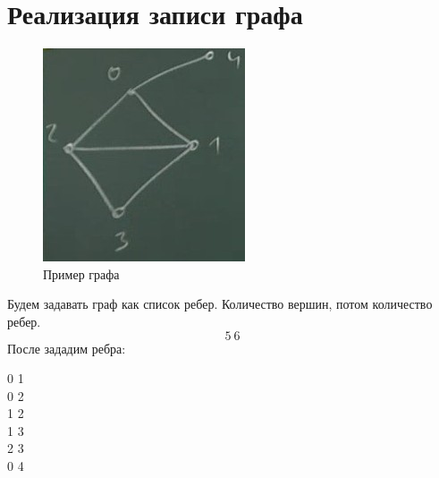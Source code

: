 \documentclass[a4paper,12pt]{article}
\theoremstyle{plain} %
\theoremstyle{definition} %
\theoremstyle{remark} %
\begin{document}
\section{Реализация записи графа}
\begin{figure}
		\begin{center}
			\includegraphics[width=\linewidth]{graph1}
			\caption{Пример графа}
			\label{Fig:graph1}
		\end{center}
\end{figure}
Будем задавать граф как список ребер. Количество вершин, потом количество ребер.\\
$$5\ 6$$
После зададим ребра:
\begin{center}
0 1\\
0 2\\
1 2\\
1 3\\
2 3\\
0 4\\
\end{center}
\end{document}
